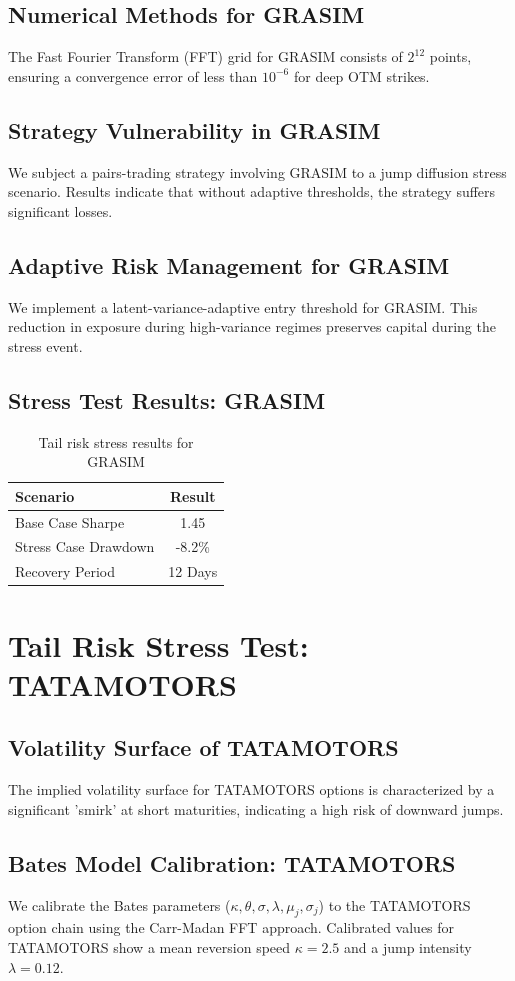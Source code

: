 \documentclass[12pt,a4paper,twoside]{article}
\begin{document}
\subsection{Numerical Methods for GRASIM}
The Fast Fourier Transform (FFT) grid for GRASIM consists of $2^{12}$ points, ensuring a convergence error of less than $10^{-6}$ for deep OTM strikes.
\subsection{Strategy Vulnerability in GRASIM}
We subject a pairs-trading strategy involving GRASIM to a jump diffusion stress scenario. Results indicate that without adaptive thresholds, the strategy suffers significant losses.
\subsection{Adaptive Risk Management for GRASIM}
We implement a latent-variance-adaptive entry threshold for GRASIM. This reduction in exposure during high-variance regimes preserves capital during the stress event.
\subsection{Stress Test Results: GRASIM}
\begin{table}[H]
\centering
\begin{tabular}{|l|c|}
\hline
Scenario & Result \\
\hline
Base Case Sharpe & 1.45 \\
Stress Case Drawdown & -8.2\% \\
Recovery Period & 12 Days \\
\hline
\end{tabular}
\caption{Tail risk stress results for GRASIM}
\end{table}
\newpage

\section{Tail Risk Stress Test: TATAMOTORS}
\subsection{Volatility Surface of TATAMOTORS}
The implied volatility surface for TATAMOTORS options is characterized by a significant 'smirk' at short maturities, indicating a high risk of downward jumps.
\subsection{Bates Model Calibration: TATAMOTORS}
We calibrate the Bates parameters ($\kappa, \theta, \sigma, \lambda, \mu_j, \sigma_j$) to the TATAMOTORS option chain using the Carr-Madan FFT approach.
Calibrated values for TATAMOTORS show a mean reversion speed $\kappa = 2.5$ and a jump intensity $\lambda = 0.12$.
\end{document}
